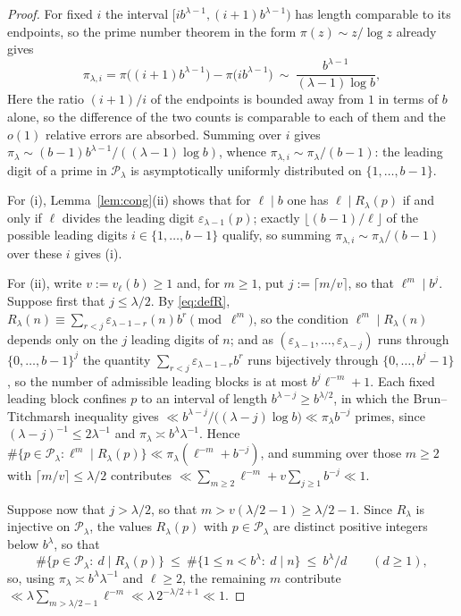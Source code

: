 \documentclass[11pt,a4paper]{article}
\theoremstyle{plain}
\theoremstyle{definition}
\newcommand{\eps}{\varepsilon}
\numberwithin{equation}{section}
\begin{document}
\begin{proof}
For fixed $i$ the interval $[ib^{\lambda-1},(i+1)b^{\lambda-1})$ has length comparable to its
endpoints, so the prime number theorem in the form $\pi(z)\sim z/\log z$ already gives
\[
\pi_{\lambda,i}=\pi\bigl((i+1)b^{\lambda-1}\bigr)-\pi\bigl(ib^{\lambda-1}\bigr)
\ \sim\ \frac{b^{\lambda-1}}{(\lambda-1)\log b},
\]
Here the ratio $(i+1)/i$ of the endpoints is bounded away from $1$ in terms of $b$ alone, so the
difference of the two counts is comparable to each of them and the $o(1)$ relative errors are
absorbed. Summing over
$i$ gives $\pi_\lambda\sim(b-1)b^{\lambda-1}/((\lambda-1)\log b)$, whence
$\pi_{\lambda,i}\sim\pi_\lambda/(b-1)$: the leading digit of a prime in $\mathcal P_\lambda$ is
asymptotically uniformly distributed on $\{1,\dots,b-1\}$.

For (i), Lemma~\ref{lem:cong}(ii) shows that for $\ell\mid b$ one has $\ell\mid R_\lambda(p)$ if and
only if $\ell$ divides the leading digit $\eps_{\lambda-1}(p)$; exactly
$\lfloor(b-1)/\ell\rfloor$ of the possible leading digits $i\in\{1,\dots,b-1\}$ qualify, so summing
$\pi_{\lambda,i}\sim\pi_\lambda/(b-1)$ over these $i$ gives (i).

For (ii), write $v:=v_\ell(b)\ge1$ and, for $m\ge1$, put $j:=\lceil m/v\rceil$, so that $\ell^{m}\mid
b^{j}$. Suppose first that $j\le\lambda/2$. By \eqref{eq:defR},
$R_\lambda(n)\equiv\sum_{r<j}\eps_{\lambda-1-r}(n)b^{r}\pmod{\ell^{m}}$, so the condition
$\ell^{m}\mid R_\lambda(n)$ depends only on the $j$ leading digits of $n$; and as
$(\eps_{\lambda-1},\dots,\eps_{\lambda-j})$ runs through $\{0,\dots,b-1\}^{j}$ the quantity
$\sum_{r<j}\eps_{\lambda-1-r}b^{r}$ runs bijectively through $\{0,\dots,b^{j}-1\}$, so the number of
admissible leading blocks is at most $b^{j}\ell^{-m}+1$. Each fixed leading block confines $p$ to an
interval of length $b^{\lambda-j}\ge b^{\lambda/2}$, in which the Brun--Titchmarsh inequality
\cite[Thm.~2]{MV} gives $\ll b^{\lambda-j}/\bigl((\lambda-j)\log b\bigr)\ll\pi_\lambda b^{-j}$ primes,
since $(\lambda-j)^{-1}\le2\lambda^{-1}$ and $\pi_\lambda\asymp b^{\lambda}\lambda^{-1}$. Hence
$\#\{p\in\mathcal P_\lambda:\ell^{m}\mid R_\lambda(p)\}\ll\pi_\lambda(\ell^{-m}+b^{-j})$, and summing over
those $m\ge2$ with $\lceil m/v\rceil\le\lambda/2$ contributes
$\ll\sum_{m\ge2}\ell^{-m}+v\sum_{j\ge1}b^{-j}\ll1$.

Suppose now that $j>\lambda/2$, so that $m>v(\lambda/2-1)\ge\lambda/2-1$. Since $R_\lambda$ is injective
on $\mathcal P_\lambda$, the values $R_\lambda(p)$ with $p\in\mathcal P_\lambda$ are distinct positive
integers below $b^{\lambda}$, so that
\begin{equation}\label{eq:trivbound}
\#\bigl\{p\in\mathcal P_\lambda:\ d\mid R_\lambda(p)\bigr\}
\ \le\ \#\bigl\{1\le n<b^{\lambda}:\ d\mid n\bigr\}\ \le\ b^{\lambda}/d
\qquad(d\ge1),
\end{equation}
so, using $\pi_\lambda\asymp b^{\lambda}\lambda^{-1}$ and $\ell\ge2$, the remaining $m$ contribute
$\ll\lambda\sum_{m>\lambda/2-1}\ell^{-m}\ll\lambda\,2^{-\lambda/2+1}\ll1$.
\end{proof}
\end{document}
